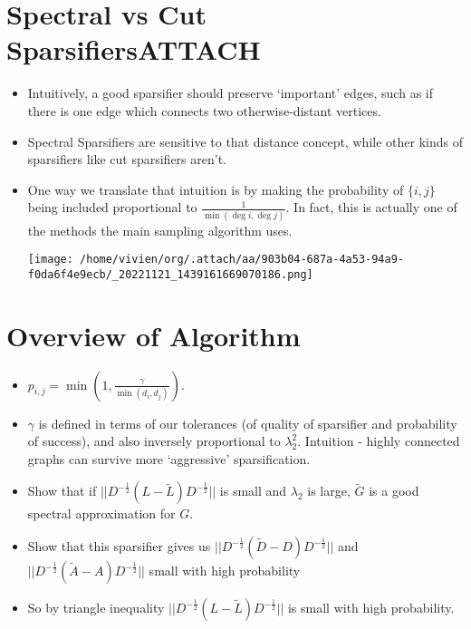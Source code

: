 \documentclass[11pt]{article}
\begin{document}
\section{Spectral vs Cut Sparsifiers\hfill{}\textsc{ATTACH}}
\label{sec:org42a440b}
\begin{itemize}
\item Intuitively, a good sparsifier should preserve `important' edges, such as if there is one edge which connects two otherwise-distant vertices.

\item Spectral Sparsifiers are sensitive to that distance concept, while other kinds of sparsifiers like cut sparsifiers aren't.

\item One way we translate that intuition is by making the probability of \(\{i,j\}\) being included proportional to  \(\frac{1}{\min(\deg i, \deg j)}\). In fact, this is actually one of the methods the main sampling algorithm uses.

\begin{center}
\texttt{[image: /home/vivien/org/.attach/aa/903b04-687a-4a53-94a9-f0da6f4e9ecb/\_20221121\_1439161669070186.png]}
\end{center}
\end{itemize}
\section{Overview of Algorithm}
\label{sec:org11a6519}
\begin{itemize}
\item \(p_{i,j}=\min(1,\frac{\gamma}{\min(d_i,d_j)})\).
\item \(\gamma\) is defined in terms of our tolerances (of quality of sparsifier and probability of success), and also inversely proportional to \(\lambda_2^2\). Intuition - highly connected graphs can survive more `aggressive' sparsification.
\item Show that if \(||D^{-\frac12}(L-\tilde{L}) D^{-\frac12}||\) is small and \(\lambda_2\) is large, \(\tilde{G}\) is a good spectral approximation for \(G\).
\item Show that this sparsifier gives us \(||D^{-\frac12}(\tilde{D}-D)D^{-\frac12}||\) and \(||D^{-\frac12}(\tilde{A}-A)D^{-\frac12}||\) small with high probability
\item So by triangle inequality \(||D^{-\frac12}(L-\tilde{L}) D^{-\frac12}||\) is small with high probability.
\end{itemize}
\end{document}
